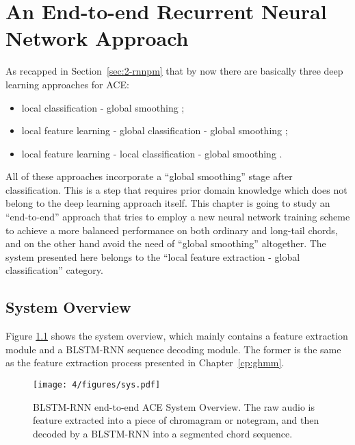 
\chapter{An End-to-end Recurrent Neural Network Approach}\label{cp:endtoend} %


As recapped in Section~\ref{sec:2-rnnpm} that by now there are basically three deep learning approaches for ACE:
\begin{itemize}
\item local classification - global smoothing \cite{humphrey2012rethinking};
\item local feature learning - global classification - global smoothing \cite{boulanger2013audio,sigtia2015audio};
\item local feature learning - local classification - global smoothing \cite{zhou2015chord}.
\end{itemize}
All of these approaches incorporate a ``global smoothing'' stage after classification. This is a step that requires prior domain knowledge which does not belong to the deep learning approach itself. This chapter is going to study an ``end-to-end'' approach that tries to employ a new neural network training scheme to achieve a more balanced performance on both ordinary and long-tail chords, and on the other hand avoid the need of ``global smoothing'' altogether. The system presented here belongs to the ``local feature extraction - global classification'' category.


\section{System Overview}\label{sec:4-sysover}
Figure \ref{fig:4-sysover} shows the system overview, which mainly contains a feature extraction module and a BLSTM-RNN sequence decoding module. The former is the same as the feature extraction process presented in Chapter~\ref{cp:ghmm}.

\begin{figure}[htb]
\centering
\texttt{[image: 4/figures/sys.pdf]}
\caption{BLSTM-RNN end-to-end ACE System Overview. The raw audio is feature extracted into a piece of chromagram or notegram, and then decoded by a BLSTM-RNN into a segmented chord sequence.}
\label{fig:4-sysover}
\end{figure}

